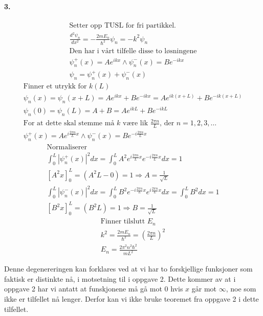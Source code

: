 \documentclass[11pt, A4paper,norsk]{article}
\begin{document}
		\paragraph{3.}
			\begin{gather*}
\text{Setter opp TUSL for fri partikkel.} \\
\frac{d^2 \psi_n}{dx^2} = - \frac{2 m E_n}{\hbar^2} \psi_n = - k^2 \psi_{n} \\
\text{Den har i vårt tilfelle disse to løsningene} \\
\psi_{n}^{+}(x) = Ae^{i k x} \wedge \psi_{n}^{-}(x) = Be^{- i k x} \\
\psi_{n} = \psi_{n}^{+}(x) + \psi_{n}^{-}(x)
			\end{gather*}
			\begin{gather*}
\text{Finner et utrykk for $k(L)$} \\
\psi_{n}(x) = \psi_{n}(x + L) = Ae^{i k x} + Be^{- i k x} = Ae^{i k (x + L)} + Be^{- i k (x + L)} \\
\psi_{n}(0) = \psi_{n}(L) = A + B = Ae^{i k L} + Be^{- i k L} \\
\text{For at dette skal stemme må $k$ være lik $\frac{2 \pi n}{L}$, der $n = 1, 2, 3, \dots$} \\
\psi_{n}^{+}(x) = Ae^{i \frac{2 \pi n}{L} x} \wedge \psi_{n}^{-}(x) = Be^{- i \frac{2 \pi n}{L} x}
			\end{gather*}
			\begin{gather*}
\text{Normaliserer} \\
\int_{0}^{L} |\psi_{n}^{+}(x)|^2 dx = \int_{0}^{L} A^2e^{i \frac{2 \pi n}{L} x} e^{- i \frac{2 \pi n}{L} x} dx = 1 \\
\left[ A^2 x \right]_{0}^{L} = \left( A^2 L - 0 \right) = 1 \Rightarrow A = \frac{1}{\sqrt{L}} \\
\int_{0}^{L} |\psi_{n}^{-}(x)|^2 dx = \int_{0}^{L} B^2e^{- i \frac{2 \pi n}{L} x} e^{i \frac{2 \pi n}{L} x} dx = \int_{0}^{L} B^2 dx = 1 \\
\left[ B^2 x \right]_{0}^{L} = \left( B^2 L \right) = 1 \Rightarrow B = \frac{1}{\sqrt{L}}
			\end{gather*}
			\begin{gather*}
\text{Finner tilslutt $E_n$} \\
k^2 = \frac{2 m E_n}{\hbar^2} = \left( \frac{2 \pi n}{L} \right)^2 \\
E_n = \frac{2 \pi^2 n^2 \hbar^2}{m L^2}
			\end{gather*}
			\begin{flushleft}
Denne degenereringen kan forklares ved at vi har to forskjellige funksjoner som faktisk er distinkte nå, i motsetning til i oppgave 2. Dette kommer av at i oppgave 2 har vi antatt at funskjonene må gå mot $0$ hvis $x$ går mot $\infty$, noe som ikke er tilfellet nå lenger. Derfor kan vi ikke bruke teoremet fra oppgave 2 i dette tilfellet.
			\end{flushleft}
\end{document}
